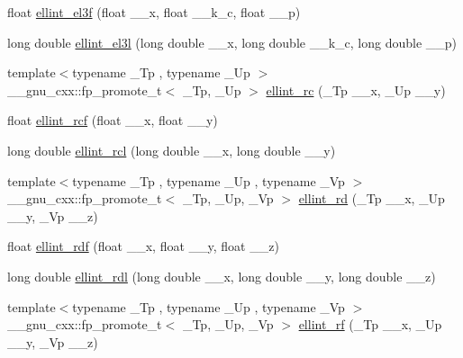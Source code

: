 \begin{DoxyCompactItemize}
\item 
float \hyperlink{group__gnu__math__spec__func_ga66131a8ecc14b5228a73a01121f60a35}{ellint\+\_\+el3f} (float \+\_\+\+\_\+x, float \+\_\+\+\_\+k\+\_\+c, float \+\_\+\+\_\+p)
\item 
long double \hyperlink{group__gnu__math__spec__func_ga0d90e66f799a2ebe4bec43eef0d53355}{ellint\+\_\+el3l} (long double \+\_\+\+\_\+x, long double \+\_\+\+\_\+k\+\_\+c, long double \+\_\+\+\_\+p)
\item 
{\footnotesize template$<$typename \+\_\+\+Tp , typename \+\_\+\+Up $>$ }\\\+\_\+\+\_\+gnu\+\_\+cxx\+::fp\+\_\+promote\+\_\+t$<$ \+\_\+\+Tp, \+\_\+\+Up $>$ \hyperlink{group__gnu__math__spec__func_ga7d3d42f5f71a74266be8aaca528056bf}{ellint\+\_\+rc} (\+\_\+\+Tp \+\_\+\+\_\+x, \+\_\+\+Up \+\_\+\+\_\+y)
\item 
float \hyperlink{group__gnu__math__spec__func_gaad5316092224ec3d92b66e79ef266adf}{ellint\+\_\+rcf} (float \+\_\+\+\_\+x, float \+\_\+\+\_\+y)
\item 
long double \hyperlink{group__gnu__math__spec__func_ga9b2f1cdeacd3615c702a77d995a0129c}{ellint\+\_\+rcl} (long double \+\_\+\+\_\+x, long double \+\_\+\+\_\+y)
\item 
{\footnotesize template$<$typename \+\_\+\+Tp , typename \+\_\+\+Up , typename \+\_\+\+Vp $>$ }\\\+\_\+\+\_\+gnu\+\_\+cxx\+::fp\+\_\+promote\+\_\+t$<$ \+\_\+\+Tp, \+\_\+\+Up, \+\_\+\+Vp $>$ \hyperlink{group__gnu__math__spec__func_gad29dae6abc783c8fe952dba477e65309}{ellint\+\_\+rd} (\+\_\+\+Tp \+\_\+\+\_\+x, \+\_\+\+Up \+\_\+\+\_\+y, \+\_\+\+Vp \+\_\+\+\_\+z)
\item 
float \hyperlink{group__gnu__math__spec__func_ga52e7cc797b9d199b7468cdbec6505357}{ellint\+\_\+rdf} (float \+\_\+\+\_\+x, float \+\_\+\+\_\+y, float \+\_\+\+\_\+z)
\item 
long double \hyperlink{group__gnu__math__spec__func_ga68a38a5f320a7184cec4b120ddef6a65}{ellint\+\_\+rdl} (long double \+\_\+\+\_\+x, long double \+\_\+\+\_\+y, long double \+\_\+\+\_\+z)
\item 
{\footnotesize template$<$typename \+\_\+\+Tp , typename \+\_\+\+Up , typename \+\_\+\+Vp $>$ }\\\+\_\+\+\_\+gnu\+\_\+cxx\+::fp\+\_\+promote\+\_\+t$<$ \+\_\+\+Tp, \+\_\+\+Up, \+\_\+\+Vp $>$ \hyperlink{group__gnu__math__spec__func_gae4859494464c7eaf98193f92b2235bc1}{ellint\+\_\+rf} (\+\_\+\+Tp \+\_\+\+\_\+x, \+\_\+\+Up \+\_\+\+\_\+y, \+\_\+\+Vp \+\_\+\+\_\+z)
\item 

\end{DoxyCompactItemize}
